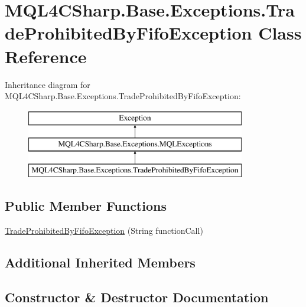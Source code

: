 \hypertarget{class_m_q_l4_c_sharp_1_1_base_1_1_exceptions_1_1_trade_prohibited_by_fifo_exception}{}\section{M\+Q\+L4\+C\+Sharp.\+Base.\+Exceptions.\+Trade\+Prohibited\+By\+Fifo\+Exception Class Reference}
\label{class_m_q_l4_c_sharp_1_1_base_1_1_exceptions_1_1_trade_prohibited_by_fifo_exception}
Inheritance diagram for M\+Q\+L4\+C\+Sharp.\+Base.\+Exceptions.\+Trade\+Prohibited\+By\+Fifo\+Exception\+:\begin{figure}[H]
\begin{center}
\leavevmode
\includegraphics[height=3.000000cm]{class_m_q_l4_c_sharp_1_1_base_1_1_exceptions_1_1_trade_prohibited_by_fifo_exception}
\end{center}
\end{figure}
\subsection*{Public Member Functions}
\begin{DoxyCompactItemize}
\item 
\hyperlink{class_m_q_l4_c_sharp_1_1_base_1_1_exceptions_1_1_trade_prohibited_by_fifo_exception_a1edbfda7fb227a699a671fd084844e40}{Trade\+Prohibited\+By\+Fifo\+Exception} (String function\+Call)
\end{DoxyCompactItemize}
\subsection*{Additional Inherited Members}


\subsection{Constructor \& Destructor Documentation}
